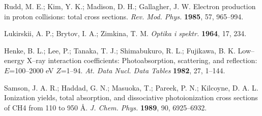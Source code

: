 \documentclass[10pt]{article}
\begin{document}
\begin{thebibliography}{10}
Rudd, M. E.; Kim, Y. K.; Madison, D. H.; Gallagher, J. W.
Electron production in proton collisions: total cross sections.
{\it Rev. Mod. Phys.} {\bf 1985}, 57, 965--994.

Lukirskii, A. P.; Brytov, I. A.; Zimkina, T. M.
{\it Optika i spektr.} {\bf 1964}, 17, 234.

Henke, B. L.; Lee, P.; Tanaka, T. J.; Shimabukuro, R. L.; Fujikawa, B. K.
Low--energy X--ray interaction coefficients: Photoabsorption, scattering, and reflection: $E$=100--2000 eV $Z$=1--94.
{\it At. Data Nucl. Data Tables} {\bf 1982}, 27, 1--144.

Samson, J. A. R.; Haddad, G. N.; Masuoka, T.; Pareek, P. N.; Kilcoyne, D. A. L.
Ionization yields, total absorption, and dissociative photoionization cross sections of CH4 from 110 to 950 \AA.
{\it J. Chem. Phys.} {\bf 1989}, 90, 6925--6932.

\end{thebibliography}
\end{document}
